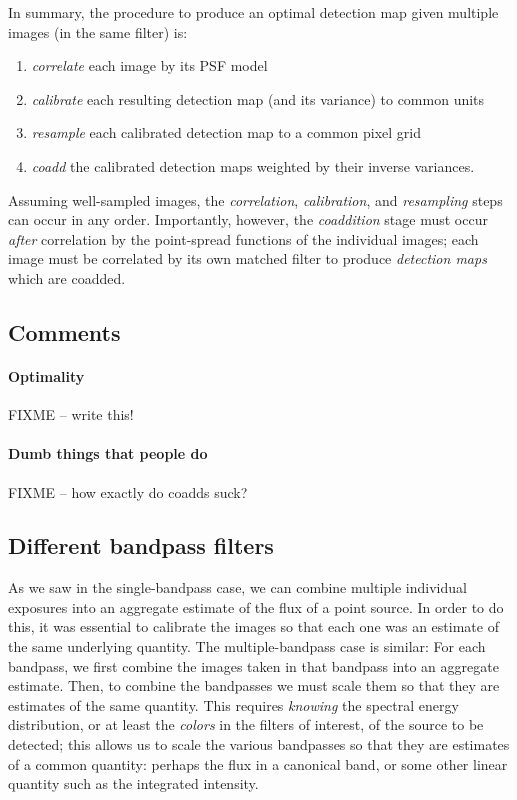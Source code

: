 \documentclass[letterpaper,preprint]{aastex62}
\begin{document}
In summary, the procedure to produce an optimal detection map given
multiple images (in the same filter) is:
\begin{enumerate}
\item \emph{correlate} each image by its PSF model
\item \emph{calibrate} each resulting detection map (and its variance)
  to common units
\item \emph{resample} each calibrated detection map to a common pixel
  grid
\item \emph{coadd} the calibrated detection maps weighted by their
  inverse variances.
\end{enumerate}
Assuming well-sampled images, the \emph{correlation},
\emph{calibration}, and \emph{resampling} steps can occur in any
order.  Importantly, however, the \emph{coaddition} stage must occur
\emph{after} correlation by the point-spread functions of the
individual images; each image must be correlated by its own matched
filter to produce \emph{detection maps} which are coadded.

\subsection{Comments}

\paragraph{Optimality} FIXME -- write this!

\paragraph{Dumb things that people do} FIXME -- how exactly do coadds suck?


\subsection{Different bandpass filters}

As we saw in the single-bandpass case, we can combine multiple
individual exposures into an aggregate estimate of the flux of a point
source.  In order to do this, it was essential to calibrate the images
so that each one was an estimate of the same underlying quantity.  The
multiple-bandpass case is similar: For each bandpass, we first combine
the images taken in that bandpass into an aggregate estimate.  Then,
to combine the bandpasses we must scale them so that they are
estimates of the same quantity.  This requires \emph{knowing} the
spectral energy distribution, or at least the \emph{colors} in the
filters of interest, of the source to be detected; this allows us to
scale the various bandpasses so that they are estimates of a common
quantity: perhaps the flux in a canonical band, or some other linear
quantity such as the integrated intensity.
\end{document}

